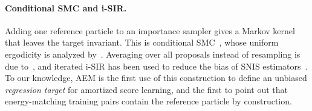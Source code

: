 \paragraph{Conditional SMC and i-SIR.}
Adding one reference particle to an importance sampler gives a Markov kernel that leaves the target invariant. This is conditional SMC~\citep{andrieu2010particle}, whose uniform ergodicity is analyzed by~\citet{andrieu2018uniform}. Averaging over all proposals instead of resampling is due to~\citet{tjelmeland2004using}, and iterated i-SIR has been used to reduce the bias of SNIS estimators~\citep{cardoso2022brsnis}.
To our knowledge, AEM is the first use of this construction to define an unbiased \emph{regression target} for amortized score learning, and the first to point out that energy-matching training pairs contain the reference particle by construction.
